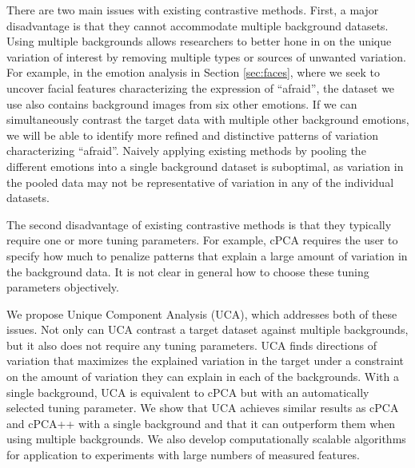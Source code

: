 \documentclass[10pt]{article}
\begin{document}
There are two main issues with existing contrastive methods. First, a major disadvantage is that they cannot accommodate multiple background datasets. Using multiple backgrounds allows researchers to better hone in on the unique variation of interest by removing multiple types or sources of unwanted variation.
For example, in the emotion analysis in Section \ref{sec:faces}, where we seek to uncover facial features characterizing the expression of ``afraid'', the dataset we use also contains background images from six other emotions. If we can simultaneously contrast the target data with multiple other background emotions, we will be able to identify more refined and distinctive patterns of variation characterizing ``afraid''. Naively applying existing methods by pooling the different emotions into a single background dataset is suboptimal, as variation in the pooled data may not be representative of variation in any of the individual datasets.

The second disadvantage of existing contrastive methods is that they typically require one or more tuning parameters. For example, cPCA requires the user to specify how much to penalize patterns that explain a large amount of variation in the background data. It is not clear in general how to choose these tuning parameters objectively.

We propose Unique Component Analysis (UCA), which addresses both of these issues. %
Not only can UCA contrast a target dataset against multiple backgrounds, but it also does not require any tuning parameters. UCA finds directions of variation that maximizes the explained variation in the target under a constraint on the amount of variation they can explain in each of the backgrounds. With a single background, UCA is equivalent to cPCA but with an automatically selected tuning parameter. We show that UCA achieves similar results as cPCA and cPCA++ with a single background and that it can outperform them when using multiple backgrounds. We also develop computationally scalable algorithms for application to experiments with large numbers of measured features.
\end{document}
